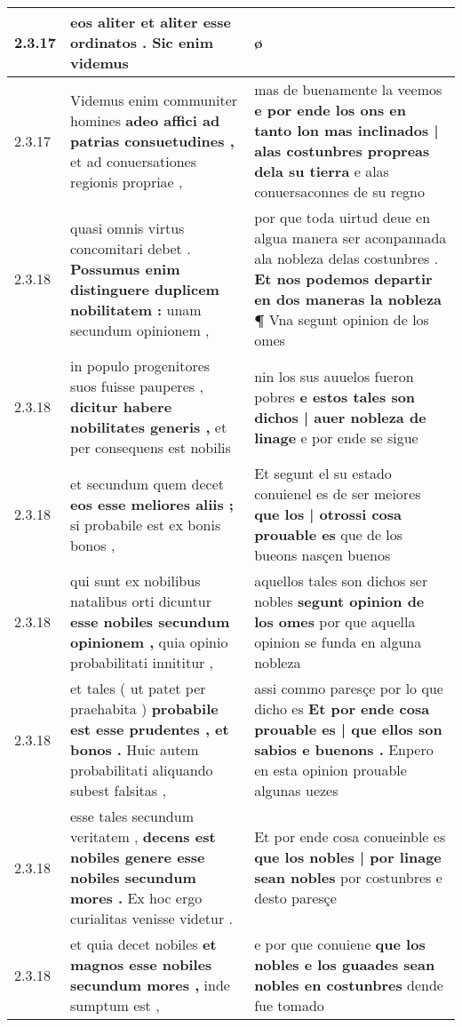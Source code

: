 \begin{tabular}{|p{1cm}|p{6.5cm}|p{6.5cm}|}
2.3.17 & eos aliter \textbf{ et aliter esse ordinatos . } Sic enim videmus & ø \\\hline
2.3.17 & Videmus enim communiter homines \textbf{ adeo affici ad patrias consuetudines , } et ad conuersationes regionis propriae , & mas de buenamente la veemos \textbf{ e por ende los ons en tanto lon mas inclinados | alas costunbres propreas dela su tierra } e alas conuersaconnes de su regno \\\hline
2.3.18 & quasi omnis virtus concomitari debet . \textbf{ Possumus enim distinguere duplicem nobilitatem : } unam secundum opinionem , & por que toda uirtud deue en algua manera ser aconpannada ala nobleza delas costunbres . \textbf{ Et nos podemos departir en dos maneras la nobleza ¶ } Vna segunt opinion de los omes \\\hline
2.3.18 & in populo progenitores suos fuisse pauperes , \textbf{ dicitur habere nobilitates generis , } et per consequens est nobilis & nin los sus auuelos fueron pobres \textbf{ e estos tales son dichos | auer nobleza de linage } e por ende se sigue \\\hline
2.3.18 & et secundum quem decet \textbf{ eos esse meliores aliis ; } si probabile est ex bonis bonos , & Et segunt el su estado conuienel es de ser meiores \textbf{ que los | otrossi cosa prouable es } que de los bueons nasçen buenos \\\hline
2.3.18 & qui sunt ex nobilibus natalibus orti dicuntur \textbf{ esse nobiles secundum opinionem , } quia opinio probabilitati innititur , & aquellos tales son dichos ser nobles \textbf{ segunt opinion de los omes } por que aquella opinion se funda en alguna nobleza \\\hline
2.3.18 & et tales ( ut patet per praehabita ) \textbf{ probabile est esse prudentes , et bonos . } Huic autem probabilitati aliquando subest falsitas , & assi commo paresçe por lo que dicho es \textbf{ Et por ende cosa prouable es | que ellos son sabios e buenons . } Enpero en esta opinion prouable algunas uezes \\\hline
2.3.18 & esse tales secundum veritatem , \textbf{ decens est nobiles genere esse nobiles secundum mores . } Ex hoc ergo curialitas venisse videtur . & Et por ende cosa conueinble es \textbf{ que los nobles | por linage sean nobles } por costunbres e desto paresçe \\\hline
2.3.18 & et quia decet nobiles \textbf{ et magnos esse nobiles secundum mores , } inde sumptum est , & e por que conuiene \textbf{ que los nobles e los guaades sean nobles en costunbres } dende fue tomado \\\hline

\end{tabular}
